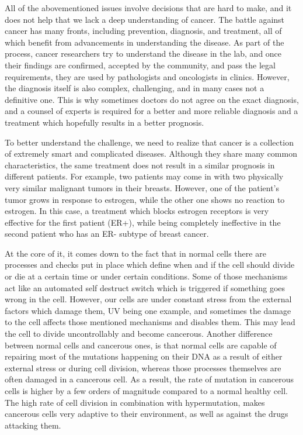 All of the abovementioned issues involve decisions that are hard to make, and
it does not help that we lack a deep understanding of cancer. The battle
against cancer has many fronts, including prevention, diagnosis, and treatment,
all of which benefit from advancements in understanding the disease. As part of
the process, cancer researchers try to understand the disease in the lab, and
once their findings are confirmed, accepted by the community, and pass the
legal requirements, they are used by pathologists and oncologists in clinics.
However, the diagnosis itself is also complex, challenging, and in many cases
not a definitive one. This is why sometimes doctors do not agree on the exact
diagnosis, and a counsel of experts is required for a better and more reliable
diagnosis and a treatment which hopefully results in a better prognosis.

To better understand the challenge, we need to realize that cancer is a
collection of extremely smart and complicated diseases. Although they share
many common characteristics, the same treatment does not result in a similar
prognosis in different patients. For example, two patients may come in with two
physically very similar malignant tumors in their breasts. However, one of the
patient's tumor grows in response to estrogen, while the other one shows no
reaction to estrogen. In this case, a treatment which blocks estrogen receptors
is very effective for the first patient (ER+), while being completely
ineffective in the second patient who has an ER- subtype of breast cancer.

At the core of it, it comes down to the fact that in normal cells there are
processes and checks put in place which define when and if the cell should
divide or die at a certain time or under certain conditions. Some of those
mechanisms act like an automated self destruct switch which is triggered if
something goes wrong in the cell. However, our cells are under constant stress
from the external factors which damage them, UV being one example, and
sometimes the damage to the cell affects those mentioned mechanisms and
disables them. This may lead the cell to divide uncontrollably and become
cancerous. Another difference between normal cells and cancerous ones, is that
normal cells are capable of repairing most of the mutations happening on their
DNA as a result of either external stress or during cell division, whereas
those processes themselves are often damaged in a cancerous cell. As a result,
the rate of mutation in cancerous cells is higher by a few orders of magnitude
compared to a normal healthy cell. The high rate of cell division in
combination with hypermutation, makes cancerous cells very adaptive to their
environment, as well as against the drugs attacking them.

